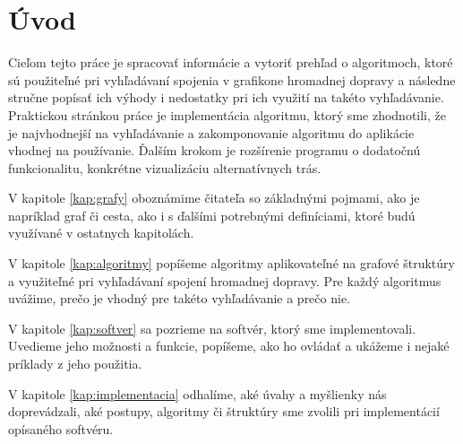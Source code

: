 \chapter*{Úvod} %

Cieľom tejto práce je spracovať informácie a vytoriť prehľad o algoritmoch, ktoré sú použiteľné  pri vyhľadávaní spojenia v grafikone hromadnej dopravy a následne stručne popísať ich výhody i nedostatky pri ich využití na takéto vyhľadávanie. Praktickou stránkou práce je implementácia algoritmu, ktorý sme zhodnotili, že je najvhodnejší na vyhľadávanie a zakomponovanie algoritmu do aplikácie vhodnej na používanie. Ďalším krokom je rozšírenie programu o dodatočnú funkcionalitu, konkrétne vizualizáciu alternatívnych trás.\newline

V kapitole \ref{kap:grafy} oboznámime čitateľa so základnými pojmami, ako je napríklad graf či cesta, ako i s ďalšími potrebnými definíciami, ktoré budú využívané v ostatnych kapitolách.\newline

V kapitole \ref{kap:algoritmy} popíšeme algoritmy aplikovateľné na grafové štruktúry a využiteľné pri vyhľadávaní spojení hromadnej dopravy. Pre každý algoritmus uvážime, prečo je vhodný pre takéto vyhľadávanie a prečo nie.\newline

V kapitole \ref{kap:softver} sa pozrieme na softvér, ktorý sme implementovali. Uvedieme jeho možnosti a funkcie, popíšeme, ako ho ovládať a ukážeme i nejaké príklady z jeho použitia.\newline

V kapitole \ref{kap:implementacia} odhalíme, aké úvahy a myšlienky nás doprevádzali, aké postupy, algoritmy či štruktúry sme zvolili pri implementácií opísaného softvéru.\newline